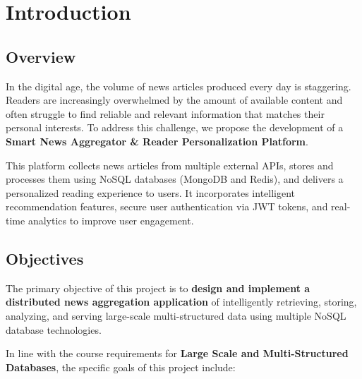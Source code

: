 

\chapter{Introduction}\label{ch:introduction}


\section{Overview}\label{sec:overview}

In the digital age, the volume of news articles produced every day is staggering.
Readers are increasingly overwhelmed by the amount of available content and often struggle to find reliable and relevant information that matches their personal interests.
To address this challenge, we propose the development of a \textbf{Smart News Aggregator \& Reader Personalization Platform}.

This platform collects news articles from multiple external APIs, stores and processes them using NoSQL databases (MongoDB and Redis), and delivers a personalized reading experience to users.
It incorporates intelligent recommendation features, secure user authentication via JWT\cite{jwt} tokens, and real-time analytics to improve user engagement.


\section{Objectives}\label{sec:objectives}

The primary objective of this project is to \textbf{design and implement a distributed news aggregation application} of intelligently retrieving,
storing, analyzing, and serving large-scale multi-structured data using multiple NoSQL database technologies.

In line with the course requirements for \textbf{Large Scale and Multi-Structured Databases}\cite{sullivan2015nosql}, the specific goals of this project include:

